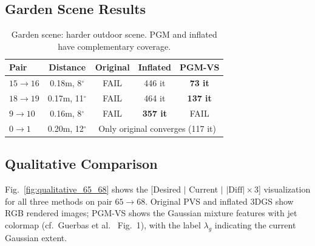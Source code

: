 \documentclass[11pt]{article}
\begin{document}
\subsection{Garden Scene Results}

\begin{table}[h!]
\centering
\caption{Garden scene: harder outdoor scene. PGM and inflated have complementary coverage.}
\label{tab:pgm_garden}
\begin{tabular}{lc|ccc}
\toprule
\textbf{Pair} & \textbf{Distance} & \textbf{Original} & \textbf{Inflated} & \textbf{PGM-VS} \\
\midrule
$15 \to 16$ & 0.18m, 8$^\circ$  & FAIL    & 446 it  & \textbf{73 it}  \\
$18 \to 19$ & 0.17m, 11$^\circ$ & FAIL    & 464 it  & \textbf{137 it} \\
$9 \to 10$  & 0.16m, 8$^\circ$  & FAIL    & \textbf{357 it}  & FAIL \\
$0 \to 1$   & 0.20m, 12$^\circ$ & \multicolumn{3}{c}{Only original converges (117 it)} \\
\bottomrule
\end{tabular}
\end{table}

\subsection{Qualitative Comparison}

Fig.~\ref{fig:qualitative_65_68} shows the [Desired $|$ Current $|$ $|\text{Diff}| \times 3$] visualization for all three methods on pair $65 \to 68$. Original PVS and inflated 3DGS show RGB rendered images; PGM-VS shows the Gaussian mixture features with jet colormap (cf.~Guerbas et al.~\cite{guerbas2021} Fig.~1), with the label $\lambda_g$ indicating the current Gaussian extent.
\end{document}
